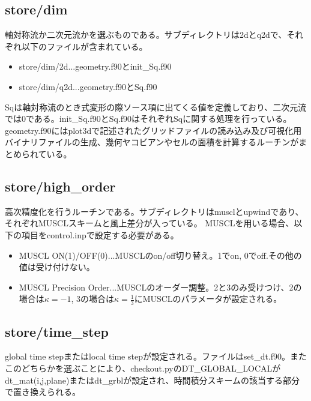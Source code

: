 \documentclass{jsarticle}
\begin{document}
\subsection{store/dim}%
軸対称流か二次元流かを選ぶものである。サブディレクトリは2dとq2dで、それぞれ以下のファイルが含まれている。
\begin{itemize}
\item store/dim/2d...geometry.f90とinit\_Sq.f90
\item store/dim/q2d...geometry.f90とSq.f90
\end{itemize}
Sqは軸対称流のとき式変形の際ソース項に出てくる値を定義しており、二次元流では0である。init\_Sq.f90とSq.f90はそれぞれSqに関する処理を行っている。
geometry.f90にはplot3dで記述されたグリッドファイルの読み込み及び可視化用バイナリファイルの生成、幾何ヤコビアンやセルの面積を計算するルーチンがまとめられている。
\subsection{store/high\_order}%
高次精度化を行うルーチンである。サブディレクトリはmusclとupwindであり、それぞれMUSCLスキームと風上差分が入っている。
MUSCLを用いる場合、以下の項目をcontrol.inpで設定する必要がある。
\begin{itemize}
\item MUSCL ON(1)/OFF(0)...MUSCLのon/off切り替え。1でon, 0でoff.その他の値は受け付けない。
\item MUSCL Precision Order...MUSCLのオーダー調整。2と3のみ受けつけ、2の場合は$\kappa =-1$, 3の場合は$\kappa=\frac 1 3$にMUSCLのパラメータが設定される。
\end{itemize}
\subsection{store/time\_step}%
global time stepまたはlocal time stepが設定される。ファイルはset\_dt.f90。またこのどちらかを選ぶことにより、checkout.pyのDT\_GLOBAL\_LOCALがdt\_mat(i,j,plane)またはdt\_grblが設定され、時間積分スキームの該当する部分で置き換えられる。
\end{document}
